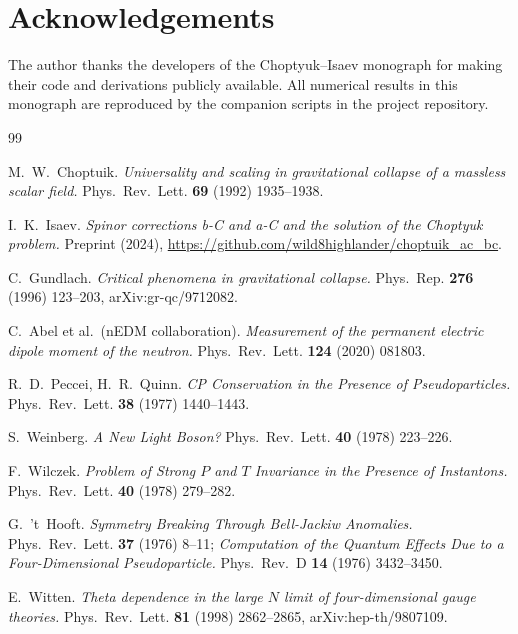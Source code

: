 \documentclass[11pt,a4paper]{article}
\theoremstyle{plain}
\theoremstyle{definition}
\theoremstyle{remark}
\begin{document}
\section*{Acknowledgements}
The author thanks the developers of the Choptyuk--Isaev monograph for
making their code and derivations publicly available.  All numerical
results in this monograph are reproduced by the companion scripts in
the project repository.

\begin{thebibliography}{99}
\small

M.~W.~Choptuik.
\textit{Universality and scaling in gravitational collapse of a
massless scalar field.}
Phys.~Rev.~Lett. \textbf{69} (1992) 1935--1938.

I.~K.~Isaev.
\textit{Spinor corrections b-C and a-C and the solution of the
Choptyuk problem.}
Preprint (2024),
\url{https://github.com/wild8highlander/choptuik_ac_bc}.

C.~Gundlach.
\textit{Critical phenomena in gravitational collapse.}
Phys.~Rep. \textbf{276} (1996) 123--203,
arXiv:gr-qc/9712082.

C.~Abel et al.\ (nEDM collaboration).
\textit{Measurement of the permanent electric dipole moment of the
neutron.}
Phys.~Rev.~Lett. \textbf{124} (2020) 081803.

R.~D.~Peccei, H.~R.~Quinn.
\textit{CP Conservation in the Presence of Pseudoparticles.}
Phys.~Rev.~Lett. \textbf{38} (1977) 1440--1443.

S.~Weinberg.
\textit{A New Light Boson?}
Phys.~Rev.~Lett. \textbf{40} (1978) 223--226.

F.~Wilczek.
\textit{Problem of Strong $P$ and $T$ Invariance in the Presence of
Instantons.}
Phys.~Rev.~Lett. \textbf{40} (1978) 279--282.

G.~'t~Hooft.
\textit{Symmetry Breaking Through Bell-Jackiw Anomalies.}
Phys.~Rev.~Lett. \textbf{37} (1976) 8--11;
\textit{Computation of the Quantum Effects Due to a
Four-Dimensional Pseudoparticle.}
Phys.~Rev.~D \textbf{14} (1976) 3432--3450.

E.~Witten.
\textit{Theta dependence in the large $N$ limit of four-dimensional
gauge theories.}
Phys.~Rev.~Lett. \textbf{81} (1998) 2862--2865,
arXiv:hep-th/9807109.


\end{thebibliography}
\end{document}
